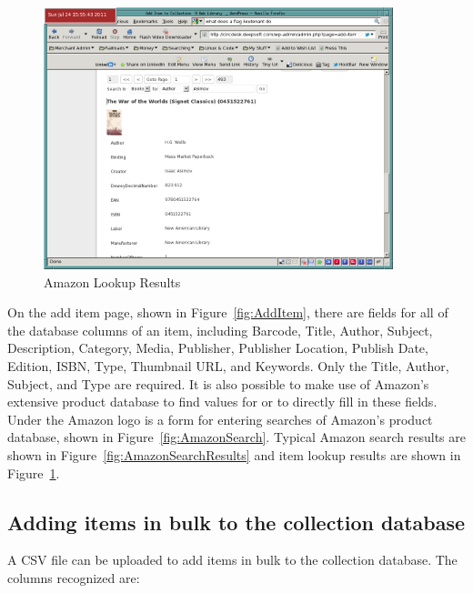 \documentclass[letterpaper,twoside]{article}
\begin{document}
\begin{figure}[htbp]
\begin{centering}
\includegraphics[width=4in]{AmazonLookupResults.png}  
\caption{Amazon Lookup Results}
\label{fig:AmazonLookupResults}
\end{centering}
\end{figure}
On the add item page, shown in Figure~\ref{fig:AddItem}, there are fields
for all of the database columns of an item, including Barcode, Title,
Author, Subject, Description, Category, Media, Publisher, Publisher
Location, Publish Date, Edition, ISBN, Type, Thumbnail URL, and
Keywords. Only the Title, Author, Subject, and Type are required.  It is
also possible to make use of Amazon's extensive product database to
find values for or to directly fill in these fields.  Under the Amazon
logo is a form for entering searches of Amazon's product database,
shown in Figure~\ref{fig:AmazonSearch}. Typical Amazon search results
are shown in Figure~\ref{fig:AmazonSearchResults} and item lookup
results are shown in Figure~\ref{fig:AmazonLookupResults}.

\subsection{Adding items in bulk to the collection database}

A CSV file can be uploaded to add items in bulk to the collection
database. The columns recognized are:
\end{document}
